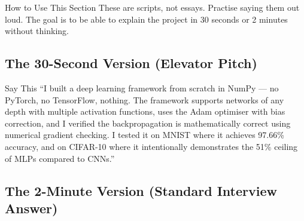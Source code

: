 \documentclass[12pt, a4paper]{article}
\begin{document}
\begin{warningbox}{How to Use This Section}
These are scripts, not essays. Practise saying them out loud. The goal is to be able to explain the project in 30 seconds or 2 minutes without thinking.
\end{warningbox}

\subsection{The 30-Second Version (Elevator Pitch)}

\begin{interviewbox}{Say This}
``I built a deep learning framework from scratch in NumPy --- no PyTorch, no TensorFlow, nothing. The framework supports networks of any depth with multiple activation functions, uses the Adam optimiser with bias correction, and I verified the backpropagation is mathematically correct using numerical gradient checking. I tested it on MNIST where it achieves 97.66\% accuracy, and on CIFAR-10 where it intentionally demonstrates the 51\% ceiling of MLPs compared to CNNs.''
\end{interviewbox}

\subsection{The 2-Minute Version (Standard Interview Answer)}
\end{document}
